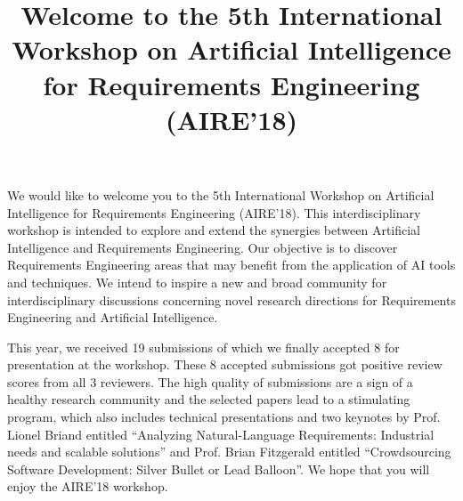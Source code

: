 \documentclass[conference,9pt]{IEEEtran}
\title{Welcome to the 5th International Workshop on Artificial Intelligence for Requirements Engineering (AIRE'18)
}
\begin{document}
\author{
%
\and
{}
\and
{}
\and
{}
}


\maketitle


\IEEEpeerreviewmaketitle

We would like to welcome you to the 5th International Workshop on Artificial Intelligence for Requirements Engineering (AIRE'18). This interdisciplinary workshop is intended to explore and extend the synergies between Artificial Intelligence and Requirements Engineering. Our objective is to discover Requirements Engineering areas that may benefit from the application of AI tools and techniques. We intend to inspire a new and broad community for interdisciplinary discussions concerning novel research directions for Requirements Engineering and Artificial Intelligence. 

This year, we received 19 submissions of which we finally accepted 8 for presentation at the workshop. These 8 accepted submissions got positive review scores from all 3 reviewers. The high quality of submissions are a sign of a healthy research community and the selected papers lead to a stimulating program, which also includes technical presentations and two keynotes by Prof. Lionel Briand entitled ``Analyzing Natural-Language Requirements: Industrial needs and scalable solutions'' and Prof. Brian Fitzgerald entitled ``Crowdsourcing Software Development: Silver Bullet or Lead Balloon''. We hope that you will enjoy the AIRE'18 workshop.
 
\end{document}
